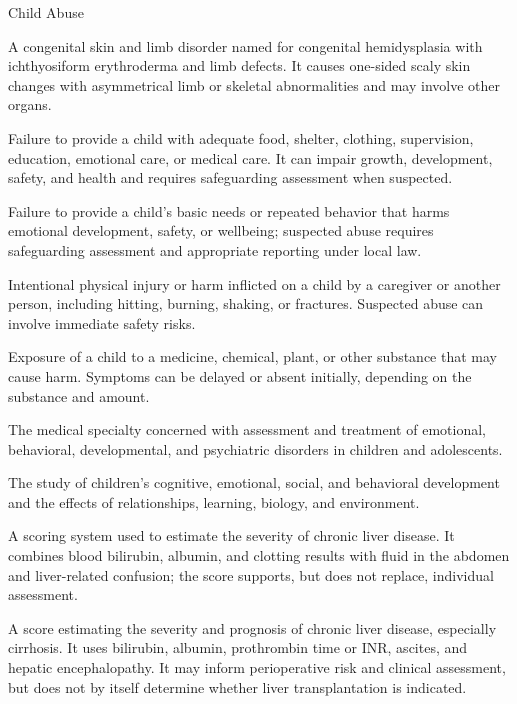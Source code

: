 
\synonyms
Child Abuse

 A congenital skin and limb disorder named for congenital hemidysplasia with ichthyosiform erythroderma and limb defects. It causes one-sided scaly skin changes with asymmetrical limb or skeletal abnormalities and may involve other organs.

 Failure to provide a child with adequate food, shelter, clothing, supervision, education, emotional care, or medical care. It can impair growth, development, safety, and health and requires safeguarding assessment when suspected.

 Failure to provide a child’s basic needs or repeated behavior that harms emotional development, safety, or wellbeing; suspected abuse requires safeguarding assessment and appropriate reporting under local law.

 Intentional physical injury or harm inflicted on a child by a caregiver or another person, including hitting, burning, shaking, or fractures. Suspected abuse can involve immediate safety risks.

 Exposure of a child to a medicine, chemical, plant, or other substance that may cause harm. Symptoms can be delayed or absent initially, depending on the substance and amount.

 The medical specialty concerned with assessment and treatment of emotional, behavioral, developmental, and psychiatric disorders in children and adolescents.

 The study of children’s cognitive, emotional, social, and behavioral development and the effects of relationships, learning, biology, and environment.

 A scoring system used to estimate the severity of chronic liver disease. It combines blood bilirubin, albumin, and clotting results with fluid in the abdomen and liver-related confusion; the score supports, but does not replace, individual assessment.

 A score estimating the severity and prognosis of
chronic liver disease, especially cirrhosis. It uses bilirubin, albumin,
prothrombin time or INR, ascites, and hepatic encephalopathy. It may inform
perioperative risk and clinical assessment, but does not by itself determine
whether liver transplantation is indicated.

